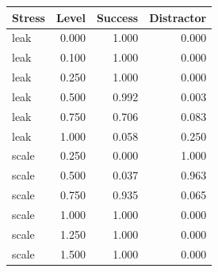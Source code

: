 \begin{tabular}{lrrr}
\toprule
Stress & Level & Success & Distractor\\
\midrule
leak & 0.000 & 1.000 & 0.000\\
leak & 0.100 & 1.000 & 0.000\\
leak & 0.250 & 1.000 & 0.000\\
leak & 0.500 & 0.992 & 0.003\\
leak & 0.750 & 0.706 & 0.083\\
leak & 1.000 & 0.058 & 0.250\\
scale & 0.250 & 0.000 & 1.000\\
scale & 0.500 & 0.037 & 0.963\\
scale & 0.750 & 0.935 & 0.065\\
scale & 1.000 & 1.000 & 0.000\\
scale & 1.250 & 1.000 & 0.000\\
scale & 1.500 & 1.000 & 0.000\\
\bottomrule
\end{tabular}

